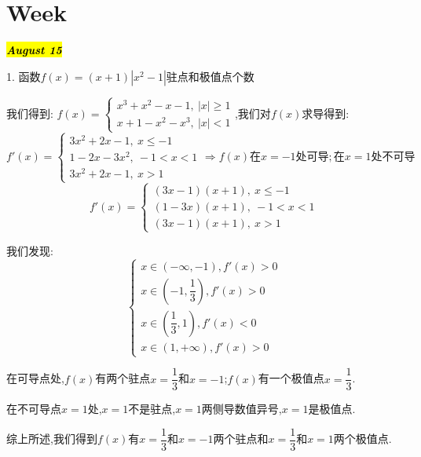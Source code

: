 \section{Week }
\hl{\textbf{\textit{August 15}}}

1. 函数$f(x)=(x+1)|x^2-1|$驻点和极值点个数
\begin{solution}

	我们得到:  $f(x)=\left\lbrace
	\begin{array}{l}
		x^3+x^2-x-1,\ |x|\geq 1\\
		x+1-x^2-x^3,\ |x|<1
	\end{array}
	\right. $,我们对$f(x)$求导得到:
	$$f'(x)=\left\lbrace
	\begin{array}{l}
		3x^2+2x-1,\ x\leq -1\\
		1-2x-3x^2,\ -1<x<1\\
		3x^2+2x-1,\ x>1
	\end{array}
	\right. \Rightarrow f(x)\text{在}x=-1\text{处可导};\text{在}x=1\text{处不可导}$$
	$$f'(x)=\left\lbrace
	\begin{array}{l}
		(3x-1)(x+1),\ x\leq -1\\
		(1-3x)(x+1),\ -1<x<1\\
		(3x-1)(x+1),\ x>1
	\end{array}
	\right.$$
	
	我们发现:  
	$$\left\lbrace
	\begin{array}{l}
		x\in(-\infty,-1),f'(x)>0\\
		x\in(-1,\dfrac{1}{3}),f'(x)>0\\
		x\in(\dfrac{1}{3},1),f'(x)<0\\
		x\in(1,+\infty),f'(x)>0
	\end{array}
	\right. $$
	
	在可导点处,$f(x)$有两个驻点$x=\dfrac{1}{3}$和$x=-1$;$f(x)$有一个极值点$x=\dfrac{1}{3}$.
	
	在不可导点$x=1$处,$x=1$不是驻点,$x=1$两侧导数值异号,$x=1$是极值点.
	
	综上所述,我们得到$f(x)$有$x=\dfrac{1}{3}$和$x=-1$两个驻点和$x=\dfrac{1}{3}$和$x=1$两个极值点.
	
\end{solution}

